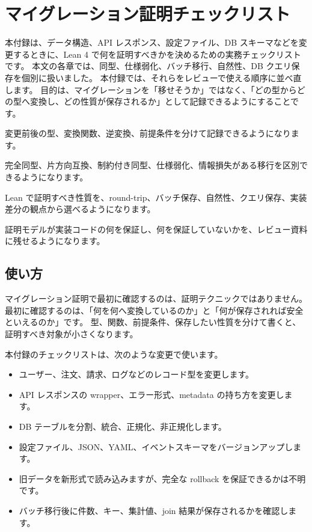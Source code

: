 \chapter{マイグレーション証明チェックリスト}
\label{app:migration-proof-checklist}

\begin{chapterabstract}
本付録は、データ構造、API レスポンス、設定ファイル、DB スキーマなどを変更するときに、Lean 4 で何を証明すべきかを決めるための実務チェックリストです。
本文の各章では、同型、仕様弱化、バッチ移行、自然性、DB クエリ保存を個別に扱いました。
本付録では、それらをレビューで使える順序に並べ直します。
目的は、マイグレーションを「移せそうか」ではなく、「どの型からどの型へ変換し、どの性質が保存されるか」として記録できるようにすることです。
\end{chapterabstract}

\begin{learninggoals}
\item 変更前後の型、変換関数、逆変換、前提条件を分けて記録できるようになります。
\item 完全同型、片方向互換、制約付き同型、仕様弱化、情報損失がある移行を区別できるようになります。
\item Lean で証明すべき性質を、round-trip、バッチ保存、自然性、クエリ保存、実装差分の観点から選べるようになります。
\item 証明モデルが実装コードの何を保証し、何を保証していないかを、レビュー資料に残せるようになります。
\end{learninggoals}

\section{使い方}

マイグレーション証明で最初に確認するのは、証明テクニックではありません。
最初に確認するのは、「何を何へ変換しているのか」と「何が保存されれば安全といえるのか」です。
型、関数、前提条件、保存したい性質を分けて書くと、証明すべき対象が小さくなります。

本付録のチェックリストは、次のような変更で使います。

\begin{itemize}
\item ユーザー、注文、請求、ログなどのレコード型を変更します。
\item API レスポンスの wrapper、エラー形式、metadata の持ち方を変更します。
\item DB テーブルを分割、統合、正規化、非正規化します。
\item 設定ファイル、JSON、YAML、イベントスキーマをバージョンアップします。
\item 旧データを新形式で読み込みますが、完全な rollback を保証できるかは不明です。
\item バッチ移行後に件数、キー、集計値、join 結果が保存されるかを確認します。
\end{itemize}

